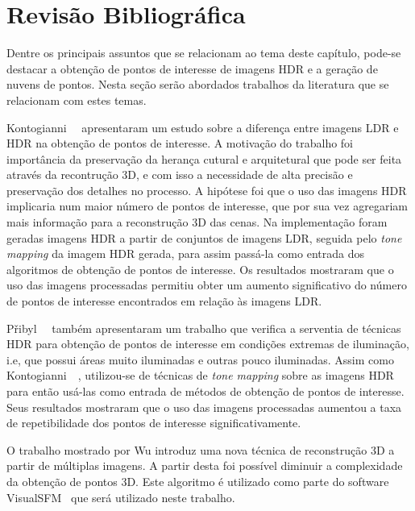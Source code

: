 \section{Revisão Bibliográfica} \label{revisaoPontos}

Dentre os principais assuntos que se relacionam ao tema deste capítulo, pode-se destacar a obtenção de pontos de interesse de imagens HDR e a geração de nuvens de pontos. Nesta seção serão abordados trabalhos da literatura que se relacionam com estes temas.

Kontogianni~\etal~\cite{hdr3d} apresentaram um estudo sobre a diferença entre imagens LDR e HDR na obtenção de pontos de interesse. A motivação do trabalho foi importância da preservação da herança cutural e arquitetural que pode ser feita através da recontrução 3D, e com isso a necessidade de alta precisão e preservação dos detalhes no processo. A hipótese foi que o uso das imagens HDR implicaria num maior número de pontos de interesse, que por sua vez agregariam mais informação para a reconstrução 3D das cenas. Na implementação foram geradas imagens HDR a partir de conjuntos de imagens LDR, seguida pelo \textit{tone mapping} da imagem HDR gerada, para assim passá-la como entrada dos algoritmos de obtenção de pontos de interesse. Os resultados mostraram que o uso das imagens processadas permitiu obter um aumento significativo do número de pontos de interesse encontrados em relação às imagens LDR.

P\v{r}ibyl~\etal~\cite{hdr3d2} também apresentaram um trabalho que verifica a serventia de técnicas HDR para obtenção de pontos de interesse em condições extremas de iluminação, i.e, que possui áreas muito iluminadas e outras pouco iluminadas. Assim como Kontogianni~\etal~\cite{hdr3d}, utilizou-se de técnicas de \textit{tone mapping} sobre as imagens HDR para então usá-las como entrada de métodos de obtenção de pontos de interesse. Seus resultados mostraram que o uso das imagens processadas aumentou a taxa de repetibilidade dos pontos de interesse significativamente.

%
O trabalho mostrado por Wu \cite{visualSFMBA} introduz uma nova técnica de reconstrução 3D a partir de múltiplas imagens. A partir desta foi possível diminuir a complexidade da obtenção de pontos 3D. Este algoritmo é utilizado como parte do software VisualSFM~\cite{visualSFM} que será utilizado neste trabalho.

